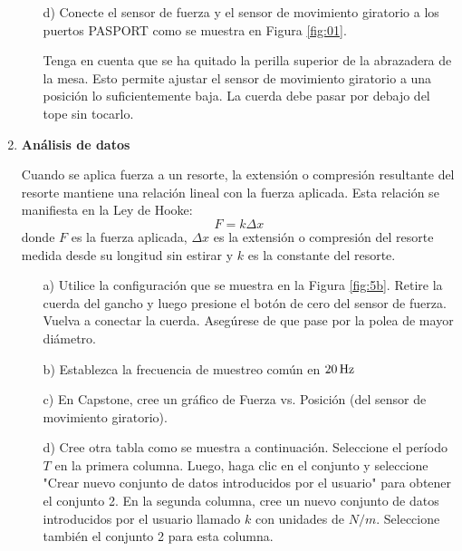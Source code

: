 \documentclass[9pt,a4paper,twocolumn,twoside]{tau-class/tau}
\begin{document}
\begin{enumerate}
\begin{itemize}
                \item [d)]  Conecte  el  sensor  de  fuerza  y  el  sensor  de  movimiento  giratorio  a  los  puertos  PASPORT  como  se  muestra en  Figura  \textcolor{blue}{\ref{fig:01}}.
                \begin{note}
                     Tenga  en  cuenta  que  se  ha  quitado  la  perilla  superior  de   la  abrazadera  de  la  mesa.  Esto  permite  ajustar  el  sensor  de  movimiento  giratorio  a  una  posición  lo  suficientemente  baja.  La  cuerda  debe  pasar  por  debajo  del  tope  sin  tocarlo.
                \end{note}
            \end{itemize}
        \item \textbf{Análisis de datos}
        
         Cuando  se  aplica  fuerza  a  un  resorte,  la  extensión  o  compresión  resultante  del  resorte  mantiene  una  relación  lineal  con  la  fuerza  aplicada.  Esta  relación  se  manifiesta  en  la  Ley  de  Hooke:
         \begin{equation}
             F=k\Delta x
         \end{equation}
         donde  $F$  es  la  fuerza  aplicada,  $\Delta x$  es  la  extensión  o  compresión  del  resorte  medida  desde  su  longitud  sin  estirar  y  $k$  es  la  constante  del  resorte.
         \begin{itemize}
                \item [a)]     Utilice  la  configuración  que  se  muestra  en  la  Figura  \textcolor{blue}{\ref{fig:5b}}.  Retire  la  cuerda  del  gancho  y  luego  presione  el botón  de  cero  del  sensor  de  fuerza.  Vuelva  a  conectar  la  cuerda.  Asegúrese  de  que  pase  por  la  polea  de  mayor  diámetro.
                \item [b)]  Establezca  la  frecuencia  de  muestreo  común  en  $20\,\rm  Hz$
                \item [c)]    En  Capstone,  cree  un  gráfico  de  Fuerza  vs.  Posición  (del  sensor  de  movimiento  giratorio).  
                \item [d)]    Cree  otra  tabla  como  se  muestra  a  continuación.  Seleccione  el  período  $T$  en  la  primera  columna.  Luego,  haga  clic  en  el  conjunto y  seleccione  "Crear  nuevo  conjunto  de  datos  introducidos  por  el  usuario"  para  obtener  el  conjunto  2.  En  la  segunda columna,  cree  un  nuevo  conjunto  de  datos  introducidos  por  el  usuario  llamado  $k$  con  unidades  de  $N/m$.  Seleccione  también  el  conjunto  2  para  esta  columna.

\end{itemize}
\end{enumerate}
\end{document}
